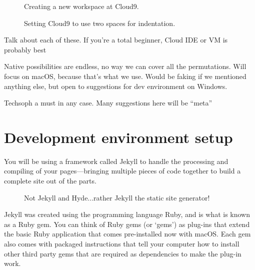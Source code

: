 \begin{figure}
\begin{center}
\end{center}
\caption{Creating a new workspace at Cloud9.\label{fig:cloud9_new_workspace}}
\end{figure}

\begin{figure}
\begin{center}
\end{center}
\caption{Setting Cloud9 to use two spaces for indentation.\label{fig:cloud9_two_spaces}}
\end{figure}

Talk about each of these. If you're a total beginner, Cloud IDE or VM is probably best

Native possibilities are endless, no way we can cover all the permutations. Will focus on macOS, because that's what we use. Would be faking if we mentioned anything else, but open to suggestions for dev environment on Windows.

Techsoph a must in any case. Many suggestions here will be ``meta''


\section{Development environment setup}
\label{sec:jekyll-intro}

You will be using a framework called Jekyll to handle the processing and compiling of your pages---bringing multiple pieces of code together to build a complete site out of the parts.

\begin{figure}[H]
\begin{center}
\end{center}
\caption{Not Jekyll and Hyde...rather Jekyll the static site generator!\label{fig:jekyll}}

\end{figure}

Jekyll was created using the programming language Ruby, and is what is known as a Ruby gem. You can think of Ruby gems (or `gems') as plug-ins that extend the basic Ruby application that comes pre-installed now with macOS\@. Each gem also comes with packaged instructions that tell your computer how to install other third party gems that are required as dependencies to make the plug-in work.

